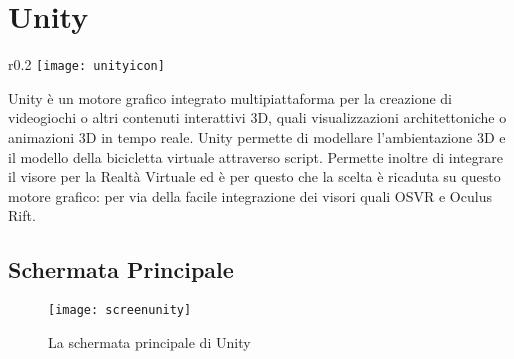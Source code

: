 \section{Unity}
\noindent 
\begin{wrapfigure}{r}{0.2\textwidth} %
    \centering
    \vspace{-1.3cm}
    \texttt{[image: unityicon]}
    \vspace{-1.3cm}
\end{wrapfigure}
Unity è un motore grafico integrato multipiattaforma per la creazione di videogiochi o altri contenuti interattivi 3D, quali visualizzazioni architettoniche o animazioni 3D in tempo reale. Unity permette di modellare l'ambientazione 3D e il modello della bicicletta virtuale attraverso script. Permette inoltre di integrare il visore per la Realtà Virtuale ed è per questo che la scelta è ricaduta su questo motore grafico: per via della facile integrazione dei visori quali OSVR e Oculus Rift.


\subsection{Schermata Principale}
\begin{figure}[htb]
    \centering
    \texttt{[image: screenunity]}
    \caption{La schermata principale di Unity\label{fig:screenunity}}
    \vspace{-0.3cm}
\end{figure}

